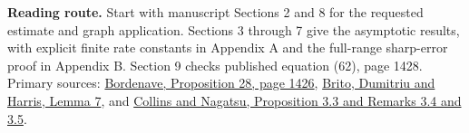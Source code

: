 \documentclass[11pt]{article}
\begin{document}
\vfill
{\small\color{ink}\textbf{Reading route.} Start with manuscript Sections 2 and 8 for the requested estimate and graph application. Sections 3 through 7 give the asymptotic results, with explicit finite rate constants in Appendix A and the full-range sharp-error proof in Appendix B. Section 9 checks published equation (62), page 1428. Primary sources: \href{https://smf.emath.fr/download/pdf/1498332}{Bordenave, Proposition 28, page 1426}, \href{https://arxiv.org/abs/1804.07808v6}{Brito, Dumitriu and Harris, Lemma 7}, and \href{https://doi.org/10.5802/alco.480}{Collins and Nagatsu, Proposition 3.3 and Remarks 3.4 and 3.5}.}
\end{document}
